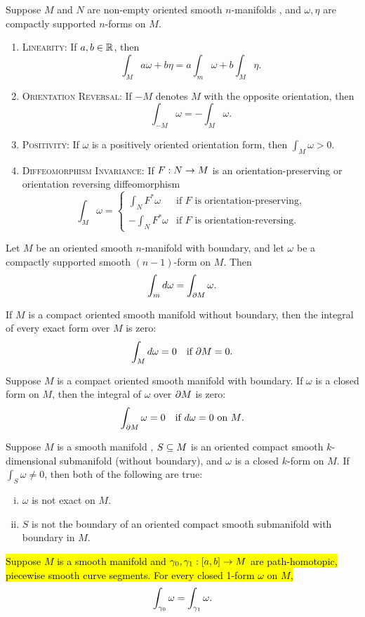 \begin{prop}
Suppose $M$ and $N$ are non-empty oriented smooth $n$-manifolds \wowob, and $\omega, \eta$ are compactly supported $n$-forms on $M$.
\begin{enumerate}
    \item {\scshape Linearity:} If $a,b\in \mathbb{R}$, then
    \[\int_M a\omega + b\eta = a\int_m\omega + b\int_M \eta.\]
    \item {\scshape Orientation Reversal:} If $-M$ denotes $M$ with the opposite orientation, then
    \[\int_{-M}\omega = -\int_M\omega.\]
    \item {\scshape Positivity:} If $\omega$ is a positively oriented orientation form, then $\int_M\omega > 0$.
    \item {\scshape Diffeomorphism Invariance:} If $F:N\rightarrow M$ is an orientation-preserving or orientation reversing diffeomorphism
    \[\int_M\omega = \begin{cases} \int_N F^*\omega & \text{if $F$ is orientation-preserving,}\\ -\int_N F^*\omega & \text{if $F$ is orientation-reversing.}\end{cases}\]
\end{enumerate}
\end{prop}


\setcounter{thm}{10}

\begin{thm}
Let $M$ be an oriented smooth $n$-manifold with boundary, and let $\omega$ be a compactly supported smooth $(n - 1)$-form on $M$. Then
\[\int_m d\omega = \int_{\partial M}\omega.\]
\end{thm}

\setcounter{thm}{12}

\begin{cor}
If $M$ is a compact oriented smooth manifold without boundary, then the integral of every exact form over $M$ is zero:
\[\int_M d\omega = 0 \quad \text{if $\partial M = 0$}.\]
\end{cor}

\begin{cor}
Suppose $M$ is a compact oriented smooth manifold with boundary. If $\omega$ is a closed form on $M$, then the integral of $\omega$ over $\partial M$ is zero:
\[\int_{\partial M} \omega = 0\quad\text{if $d\omega = 0$ on $M$}.\]
\end{cor}

\begin{cor}
Suppose $M$ is a smooth manifold \wowob, $S\subseteq M$ is an oriented compact smooth $k$-dimensional submanifold (without boundary), and $\omega$ is a closed $k$-form on $M$. If $\int_S\omega \neq 0$, then both of the following are true:
\begin{enumerate}[(i)]
    \item $\omega$ is not exact on $M$.
    \item $S$ is not the boundary of an oriented compact smooth submanifold with boundary in $M$.
\end{enumerate}
\end{cor}

\setcounter{thm}{25}

\begin{thm}
  \hl{Suppose $M$ is a smooth manifold and $\gamma_0, \gamma_1:[a,b]\rightarrow M$ are path-homotopic, piecewise smooth curve segments. For every closed 1-form $\omega$ on $M$,}
  \[\int_{\gamma_0}\omega = \int_{\gamma_1}\omega.\]
\end{thm}
